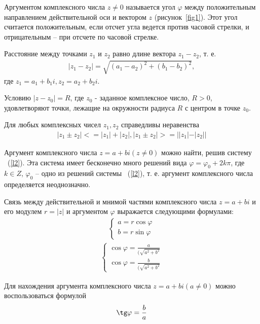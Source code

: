 \documentclass[14pt]{extreport}
\begin{document}
Аргументом комплексного числа $z \neq 0$ называется угол $\varphi$ между положительным направлением действительной оси и вектором $z$ (рисунок~\ref{fig1}). Этот угол считается положительным, если отсчет угла ведется против часовой стрелки, и отрицательным – при отсчете по часовой стрелке.

Расстояние между точками $z_1$ и $z_2$ равно длине вектора $z_1 - z_2$, т. е. 
\begin{eqnarray*}
 |z_1 - z_2| = \sqrt{(a_1 - a_2)^2 + (b_1 - b_2)^2},
\end{eqnarray*}
где $z_1 = a_1 + b_1i, z_2 = a_2 + b_2i$.

Условию $|z - z_0| = R$, где $z_0$ - заданное комплексное число, $R>0$, удовлетворяют точки, лежащие на окружности радиуса $R$ с центром в точке $z_0$.

Для любых комплексных чисел $z_1, z_2$ справедливы неравенства
\begin{eqnarray*}
 |z_1 \pm z_2| <= |z_1| + |z_2|, |z_1 \pm z_2| >= ||z_1| - |z_2||
\end{eqnarray*}

Аргумент комплексного числа $z=a+bi (z\neq0)$ можно найти, решив систему ~(\ref{l2}). Эта система имеет бесконечно много решений вида $\varphi=\varphi_0+2k\pi$, где $k \in Z$, $\varphi_0$ – одно из решений системы ~(\ref{l2}), т. е. аргумент комплексного числа определяется неоднозначно.

Связь между действительной и мнимой частями комплексного числа $z=a+bi$ и его модулем $r=|z|$ и аргументом $\varphi$ выражается следующими формулами:
\begin{eqnarray}
 \begin{cases}
   a=r\cos\varphi \\
   b=r\sin\varphi
 \end{cases}
 \label{l1}
\end{eqnarray}
\begin{eqnarray}
 \begin{cases}
   \cos\varphi=\frac{a}{(\sqrt{a^2+b^2}} \\
   \cos\varphi=\frac{b}{(\sqrt{a^2+b^2}}
 \end{cases}
 \label{l2}
\end{eqnarray}

Для нахождения аргумента комплексного числа $z=a+bi (a\neq0)$ можно воспользоваться формулой
\begin{eqnarray}
\tg\varphi = \frac{b}{a}
 \label{l3}
\end{eqnarray}
\end{document}
